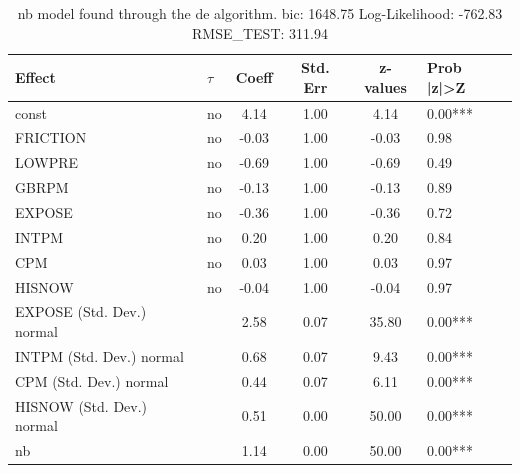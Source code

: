 \begin{table}
	\caption{nb model found through the de algorithm. bic: 1648.75 Log-Likelihood: -762.83 RMSE_TEST: 311.94}
	\begin{center}
		\begin{tabular}{|l|l|c|c|c|l|}
			\hline
			Effect & $\tau$ & Coeff & Std. Err & z-values & Prob |z|>Z \\
			\hline
			const & no & 4.14 & 1.00 & 4.14 & 0.00*** \\
			\hline
			FRICTION & no & -0.03 & 1.00 & -0.03 & 0.98 \\
			\hline
			LOWPRE & no & -0.69 & 1.00 & -0.69 & 0.49 \\
			\hline
			GBRPM & no & -0.13 & 1.00 & -0.13 & 0.89 \\
			\hline
			EXPOSE & no & -0.36 & 1.00 & -0.36 & 0.72 \\
			\hline
			INTPM & no & 0.20 & 1.00 & 0.20 & 0.84 \\
			\hline
			CPM & no & 0.03 & 1.00 & 0.03 & 0.97 \\
			\hline
			HISNOW & no & -0.04 & 1.00 & -0.04 & 0.97 \\
			\hline
			EXPOSE (Std. Dev.) normal &  & 2.58 & 0.07 & 35.80 & 0.00*** \\
			\hline
			INTPM (Std. Dev.) normal &  & 0.68 & 0.07 & 9.43 & 0.00*** \\
			\hline
			CPM (Std. Dev.) normal &  & 0.44 & 0.07 & 6.11 & 0.00*** \\
			\hline
			HISNOW (Std. Dev.) normal &  & 0.51 & 0.00 & 50.00 & 0.00*** \\
			\hline
			nb &  & 1.14 & 0.00 & 50.00 & 0.00*** \\
			\hline
		\end{tabular}
	\end{center}
\end{table}